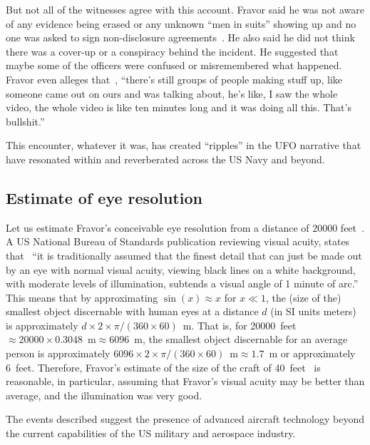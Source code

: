 But not all of the witnesses agree with this account.  Fravor
said he was not aware of any evidence being erased
or any unknown ``men in suits'' showing up  and no one was asked to sign non-disclosure agreements~\cite{PMWitnesses2021Mar}.
He also said he did not think there was a cover-up or a conspiracy behind the incident.
He suggested that maybe some of the officers were confused or misremembered what happened.
Fravor even alleges that~\cite{Powerfuljre2019Oct}, ``there's still groups of people making stuff up,
like someone came out on ours and was talking about, he's like, I saw the whole video, the whole video is
like ten minutes long and it was doing all this. That's bullshit.''

This encounter, whatever it was, has created ``ripples'' in the UFO narrative that have resonated within and reverberated across the US Navy and beyond.

\subsection{Estimate of eye resolution}

Let us estimate Fravor's conceivable eye resolution from a distance of 20000 feet~\cite[time=646s]{Powerfuljre2019Oct}. A US National Bureau of Standards publication reviewing visual acuity, states that~\cite[p.~10]{Howett1983Jul} ``it is traditionally assumed that the finest detail that can just be made out by an eye with normal visual acuity, viewing black lines on a white background, with moderate levels of illumination, subtends a visual angle of 1 minute of arc.'' This means that by approximating
$\sin(x) \approx x$ for $x\ll 1$, the (size of the) smallest object discernable with human eyes at a distance $d$ (in SI units meters)
is approximately $d \times 2 \times \pi /(360\times 60)$~m. That is, for 20000~feet$\approx 20000 \times 0.3048$~m$\approx 6096$~m,
the smallest object discernable for an average person is approximately $6096 \times 2 \times \pi /(360\times 60)$~m$\approx 1.7$~m or  approximately 6~feet.
Therefore, Fravor's estimate of the size of the craft of 40~feet~\cite[time=652s]{Powerfuljre2019Oct} is reasonable, in particular,
assuming that Fravor's visual acuity may be better than average, and the illumination was very good.

The events described suggest the presence of advanced aircraft technology beyond the current capabilities
of the US military and aerospace industry.

